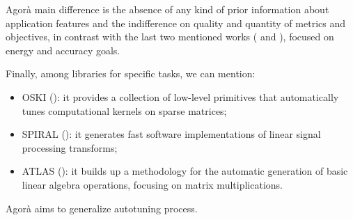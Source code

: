Agorà main difference is the absence of any kind of prior information about application features and the indifference on quality and quantity of metrics and objectives, in contrast with the last two mentioned works (\cite{baek2010green} and \cite{hoffmann2011dynamic}), focused on energy and accuracy goals.

Finally, among libraries for specific tasks, we can mention:

\begin{itemize}

	\item OSKI (\cite{vuduc2005oski}): it provides a collection of low-level primitives that automatically tunes computational kernels on sparse matrices;

	\item SPIRAL (\cite{puschel2004spiral}): it generates fast software implementations of linear signal processing transforms;

	\item ATLAS (\cite{whaley1998automatically}): it builds up a methodology for the automatic generation of basic linear algebra operations, focusing on matrix multiplications.

\end{itemize}

Agorà aims to generalize autotuning process.
